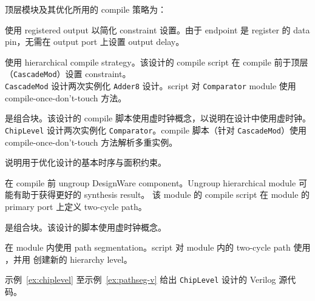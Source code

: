 顶层模块及其优化所用的 compile 策略为：
\begin{description}[style=nextline,leftmargin=3cm,font=\ttfamily]
  \item[Adder16]
        使用 registered output 以简化 constraint 设置。由于 endpoint 是 register 的 data pin，无需在 output port 上设置 output delay。
  \item[CascadeMod]
        使用 hierarchical compile strategy。该设计的 compile script 在 compile 前于顶层（\texttt{CascadeMod}）设置 constraint。\\
        \texttt{CascadeMod} 设计两次实例化 \texttt{Adder8} 设计。script 对 \texttt{Comparator} module 使用 compile-once-don't-touch 方法。
  \item[Comparator]
        是组合块。该设计的 compile 脚本使用虚时钟概念，以说明在设计中使用虚时钟。\\
        \texttt{ChipLevel} 设计两次实例化 \texttt{Comparator}。compile 脚本（针对 \texttt{CascadeMod}）使用 compile-once-don't-touch 方法解析多重实例。
  \item[Multiply8x8]
        说明用于优化设计的基本时序与面积约束。
  \item[Multiply16x16]
        在 compile 前 ungroup DesignWare component。Ungroup hierarchical module 可能有助于获得更好的 synthesis result。
        该 module 的 compile script 在 module 的 primary port 上定义 two-cycle path。
  \item[MuxMod]
        是组合块。该设计的脚本使用虚时钟概念。
  \item[PathSegment]
        在 module 内使用 path segmentation。script 对 module 内的 two-cycle path 使用 ，并用  创建新的 hierarchy level。
\end{description}

示例~\ref{ex:chiplevel} 至示例~\ref{ex:pathseg-v} 给出 \texttt{ChipLevel} 设计的 Verilog 源代码。


